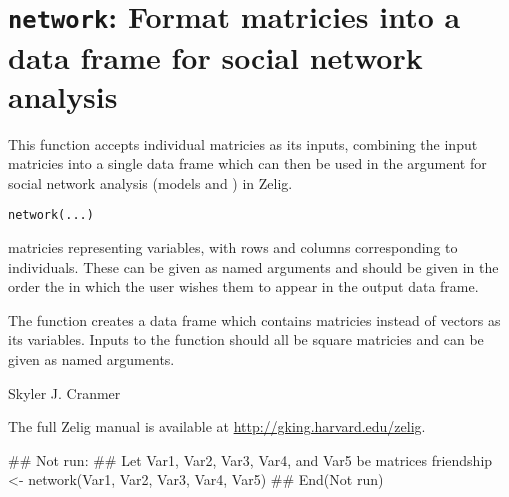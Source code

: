 \section{{\tt network}: Format matricies into a data frame for social network analysis}\label{ss:network}
\begin{Description}\relax
This function accepts individual matricies as its inputs,
combining the input matricies into a single data frame which can then be
used in the  argument for social network analysis (models
 and ) in Zelig.
\end{Description}
\begin{Usage}
\begin{verbatim}
network(...)
\end{verbatim}
\end{Usage}
\begin{Arguments}
\begin{ldescription}
\item[\code{...}] matricies representing variables, with rows and columns corresponding to
individuals.  These can be given as named arguments and should be
given in the order the in which the user wishes them to appear in
the output data frame.
\end{ldescription}
\end{Arguments}
\begin{Value}
The  function creates a data frame which
contains matricies instead of vectors as its variables.  Inputs to the
function should all be square matricies and can be given as named
arguments.
\end{Value}
\begin{Author}\relax
Skyler J. Cranmer
\end{Author}
\begin{SeeAlso}\relax
The full Zelig manual is available at
\url{http://gking.harvard.edu/zelig}.
\end{SeeAlso}
\begin{Examples}
\begin{ExampleCode}## Not run: 
## Let Var1, Var2, Var3, Var4, and Var5 be matrices
friendship <- network(Var1, Var2, Var3, Var4, Var5)
## End(Not run)
\end{ExampleCode}
\end{Examples}


